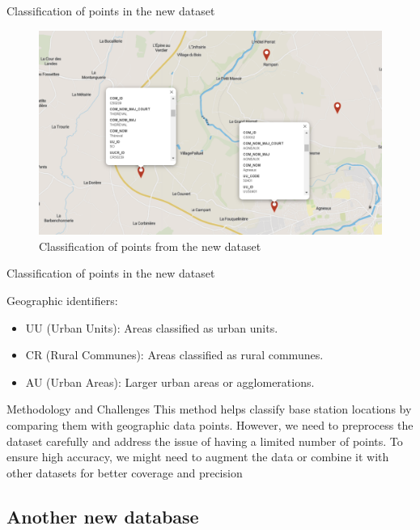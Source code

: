 \begin{frame}{Classification of points in the new dataset}
    \begin{figure}
        \includegraphics[height=0.6\paperheight]{images/Geo_approach/New_dataset_points_ill.png}
        \caption{Classification of points from the new dataset}
    \end{figure}
\end{frame}
\begin{frame}{Classification of points in the new dataset}
    \begin{block}{Geographic identifiers:}
        \begin{itemize}
        \item UU (Urban Units): Areas classified as urban units.
        \item CR (Rural Communes): Areas classified as rural communes.
        \item AU (Urban Areas): Larger urban areas or agglomerations.
        \end{itemize}
    \end{block}
    \begin{block}{Methodology and Challenges}
            This method helps classify base station locations by comparing them with geographic data points. However, we need to preprocess the dataset carefully and address the issue of having a limited number of points. To ensure high accuracy, we might need to augment the data or combine it with other datasets for better coverage and precision
    \end{block}
\end{frame}

\subsection{Another new database}
\insertsubsectionframe

